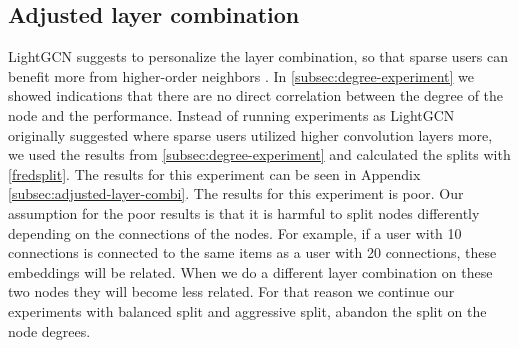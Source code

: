 \subsection{Adjusted layer combination}
LightGCN suggests to personalize the layer combination, so that sparse users can benefit more from higher-order neighbors \cite{lightgcn}.
In \autoref{subsec:degree-experiment} we showed indications that there are no direct correlation between the degree of the node and the performance.
Instead of running experiments as LightGCN originally suggested where sparse users utilized higher convolution layers more, we used the results from \autoref{subsec:degree-experiment} and calculated the splits with \autoref{fredsplit}.
The results for this experiment can be seen in Appendix \ref{subsec:adjusted-layer-combi}.
The results for this experiment is poor.
Our assumption for the poor results is that it is harmful to split nodes differently depending on the connections of the nodes.
For example, if a user with 10 connections is connected to the same items as a user with 20 connections, these embeddings will be related.
When we do a different layer combination on these two nodes they will become less related.
For that reason we continue our experiments with balanced split and aggressive split, abandon the split on the node degrees.
